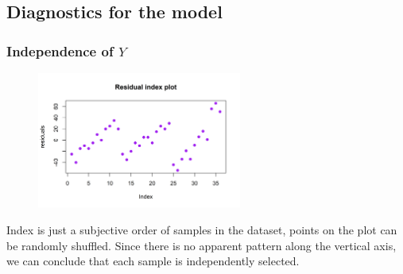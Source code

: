 \documentclass[a4paper,11pt,onecolumn,twoside]{article}
\begin{document}
\subsection{Diagnostics for the model}
\subsubsection{Independence of $Y$}
\begin{figure}[H]
\centering
\includegraphics[width=0.6\textwidth,height=0.3\textheight]{3.png}	
\end{figure}
Index is just a subjective order of samples in the dataset, points on the plot can be randomly shuffled. Since there is no apparent pattern along the vertical axis, we can conclude that each sample is independently selected.
\end{document}
